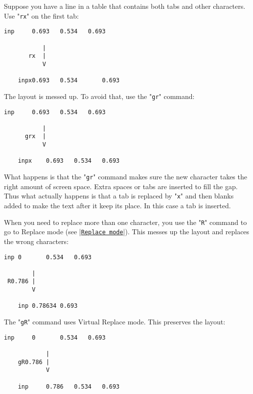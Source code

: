 Suppose you have a line in a table that contains both tabs and other characters.
Use "\texttt{rx}" on the first tab:

\begin{Verbatim}[samepage=true]
    inp     0.693   0.534   0.693 

           |
       rx  |
           V

    inpx0.693   0.534       0.693 
\end{Verbatim}

The layout is messed up.
To avoid that, use the "\texttt{gr}" command:

\begin{Verbatim}[samepage=true]
    inp     0.693   0.534   0.693 

           |
      grx  |
           V

    inpx    0.693   0.534   0.693 
\end{Verbatim}

What happens is that the "\texttt{gr}" command makes sure the new character takes the right amount of screen space.
Extra spaces or tabs are inserted to fill the gap.
Thus what actually happens is that a tab is replaced by "\texttt{x}" and then blanks added to make the text after it keep its place.
In this case a tab is inserted.

When you need to replace more than one character, you use the "\texttt{R}" command to go to Replace mode (see |\hyperref[Replace mode]{\texttt{Replace mode}}|).
This messes up the layout and replaces the wrong characters:

\begin{Verbatim}[samepage=true]
    inp 0       0.534   0.693 

        |
 R0.786 |
        V

    inp 0.78634 0.693 
\end{Verbatim}

The "\texttt{gR}" command uses Virtual Replace mode.
This preserves the layout:

\begin{Verbatim}[samepage=true]
    inp     0       0.534   0.693 

            |
    gR0.786 |
            V

    inp     0.786   0.534   0.693 
\end{Verbatim}

\clearpage
